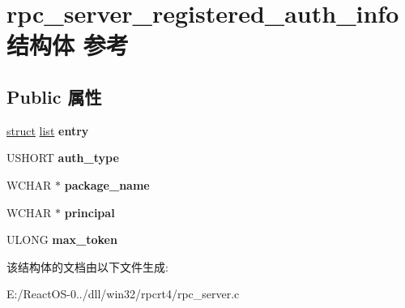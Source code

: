 \hypertarget{structrpc__server__registered__auth__info}{}\section{rpc\+\_\+server\+\_\+registered\+\_\+auth\+\_\+info结构体 参考}
\label{structrpc__server__registered__auth__info}
\subsection*{Public 属性}
\begin{DoxyCompactItemize}
\item 
\mbox{\label{structrpc__server__registered__auth__info_a128256d38f61c63483f83026e0257210}} 
\hyperlink{interfacestruct}{struct} \hyperlink{classlist}{list} {\bfseries entry}
\item 
\mbox{\label{structrpc__server__registered__auth__info_aec806ff5417527979dd2820dd2de74ec}} 
U\+S\+H\+O\+RT {\bfseries auth\+\_\+type}
\item 
\mbox{\label{structrpc__server__registered__auth__info_a48e6c27aa3591fd78a19546743810807}} 
W\+C\+H\+AR $\ast$ {\bfseries package\+\_\+name}
\item 
\mbox{\label{structrpc__server__registered__auth__info_a74b5c6deed7946b827c4cea44f3b4c0b}} 
W\+C\+H\+AR $\ast$ {\bfseries principal}
\item 
\mbox{\label{structrpc__server__registered__auth__info_a1ddd901578d35ffb8856090554c28229}} 
U\+L\+O\+NG {\bfseries max\+\_\+token}
\end{DoxyCompactItemize}


该结构体的文档由以下文件生成\+:\begin{DoxyCompactItemize}
\item 
E\+:/\+React\+O\+S-\/0../dll/win32/rpcrt4/rpc\+\_\+server.\+c\end{DoxyCompactItemize}
